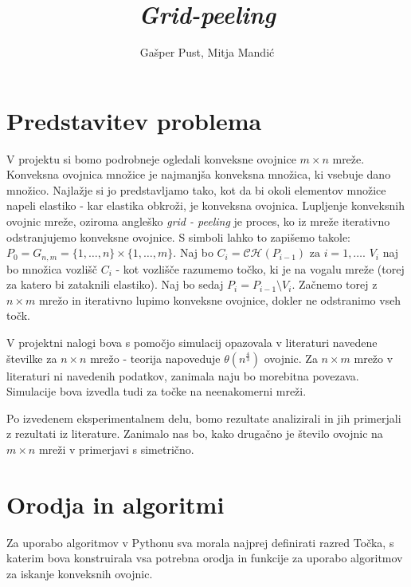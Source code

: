 \documentclass[a4paper]{article}
\title{\textit{Grid-peeling}}
\author{Gašper Pust, Mitja Mandić}
\begin{document}
\lstset{language=Python, breaklines=true, columns=fullflexible, basicstyle=\ttfamily}
\begin{titlepage}
 \maketitle
\end{titlepage}
%

\section{Predstavitev problema}
V projektu si bomo podrobneje ogledali konveksne ovojnice $m \times n$ mreže. Konveksna ovojnica množice je najmanjša konveksna množica, ki vsebuje dano množico.
Najlažje si jo predstavljamo tako, kot da bi okoli elementov množice napeli elastiko - kar elastika obkroži, je konveksna ovojnica. Lupljenje konveksnih ovojnic mreže,
oziroma angleško \textit{grid - peeling} je proces, ko iz mreže iterativno odstranjujemo konveksne ovojnice. S simboli lahko to zapišemo takole:
$ P_{0} = G_{n,m} = \{1,\ldots, n\} \times \{1, \ldots, m\}$. Naj bo $C_{i} = \mathcal{C}\mathcal{H}(P_{i-1}) \text{ za } i = 1, \ldots$. $V_{i}$ naj bo množica vozlišč $C_{i}$
- kot vozlišče razumemo točko, ki je na vogalu mreže (torej za katero bi zataknili elastiko). Naj bo sedaj $P_{i} = P_{i-1} \setminus V_{i}$. Začnemo torej z $n \times m$ mrežo 
in iterativno lupimo konveksne ovojnice, dokler ne odstranimo vseh točk.

V projektni nalogi bova s pomočjo simulacij opazovala v literaturi navedene številke za $n \times n$ mrežo - teorija napoveduje $\theta(n ^ \frac{4}{3})$ ovojnic.
Za $n \times m$ mrežo v literaturi ni navedenih podatkov, zanimala naju bo morebitna povezava. Simulacije bova izvedla tudi za točke na neenakomerni mreži.

Po izvedenem eksperimentalnem delu, bomo rezultate analizirali in jih primerjali z rezultati iz literature. Zanimalo nas bo, kako drugačno je število ovojnic na $m \times n$
mreži v primerjavi s simetrično.

\section{Orodja in algoritmi}
Za uporabo algoritmov v Pythonu sva morala najprej definirati razred Točka, s katerim bova konstruirala vsa potrebna orodja in funkcije za uporabo algoritmov za iskanje konveksnih ovojnic.
\end{document}
